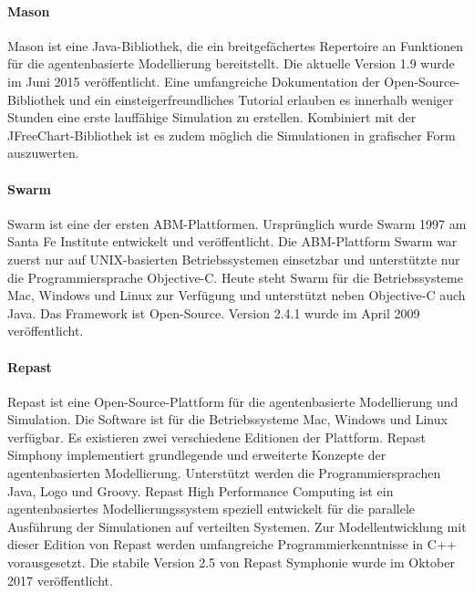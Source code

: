 \documentclass[a4paper, 11pt]{article}
\begin{document}
\paragraph{Mason}
Mason ist eine Java-Bibliothek, die ein breitgefächertes Repertoire an Funktionen für die agentenbasierte Modellierung bereitstellt. Die aktuelle Version 1.9 wurde im Juni 2015 veröffentlicht. Eine umfangreiche Dokumentation der Open-Source-Bibliothek und ein einsteigerfreundliches Tutorial erlauben es innerhalb weniger Stunden eine erste lauffähige Simulation zu erstellen. Kombiniert mit der JFreeChart-Bibliothek ist es zudem möglich die Simulationen in grafischer Form auszuwerten.
\paragraph{Swarm}
Swarm ist eine der ersten ABM-Plattformen. Ursprünglich wurde Swarm 1997 am Santa Fe Institute entwickelt und veröffentlicht. Die ABM-Plattform Swarm war zuerst nur auf UNIX-basierten Betriebssystemen einsetzbar und unterstützte nur die Programmiersprache Objective-C. Heute steht Swarm für die Betriebssysteme Mac, Windows und Linux zur Verfügung und unterstützt neben Objective-C auch Java. Das Framework ist Open-Source. Version 2.4.1 wurde im April 2009 veröffentlicht.
\paragraph{Repast}
Repast ist eine Open-Source-Plattform für die agentenbasierte Modellierung und Simulation. Die Software ist für die Betriebssysteme Mac, Windows und Linux verfügbar. Es existieren zwei verschiedene Editionen der Plattform. Repast Simphony implementiert grundlegende und erweiterte Konzepte der agentenbasierten Modellierung. Unterstützt werden die Programmiersprachen Java, Logo und Groovy. Repast High Performance Computing ist ein agentenbasiertes Modellierungssystem speziell entwickelt für die parallele Ausführung der Simulationen auf verteilten Systemen. Zur Modellentwicklung mit dieser Edition von Repast werden umfangreiche Programmierkenntnisse in C++ vorausgesetzt. Die stabile Version 2.5 von Repast Symphonie wurde im Oktober 2017 veröffentlicht. 
\end{document}
